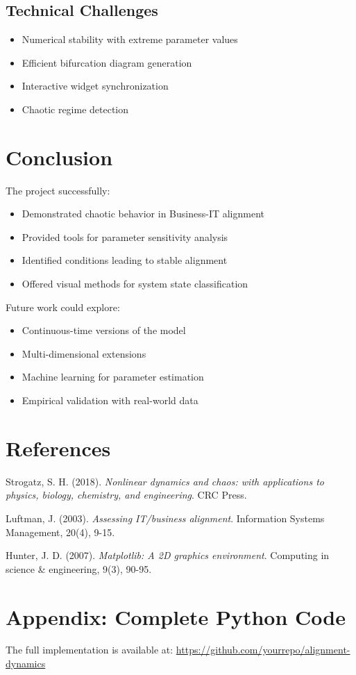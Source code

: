 \documentclass[a4paper, 12pt]{article}
\begin{document}
\subsection{Technical Challenges}
\begin{itemize}
	\item Numerical stability with extreme parameter values
	\item Efficient bifurcation diagram generation
	\item Interactive widget synchronization
	\item Chaotic regime detection
\end{itemize}

\section{Conclusion}
The project successfully:
\begin{itemize}
	\item Demonstrated chaotic behavior in Business-IT alignment
	\item Provided tools for parameter sensitivity analysis
	\item Identified conditions leading to stable alignment
	\item Offered visual methods for system state classification
\end{itemize}

Future work could explore:
\begin{itemize}
	\item Continuous-time versions of the model
	\item Multi-dimensional extensions
	\item Machine learning for parameter estimation
	\item Empirical validation with real-world data
\end{itemize}

\section*{References}
\begin{thebibliography}{9}
	Strogatz, S. H. (2018). \textit{Nonlinear dynamics and chaos: with applications to physics, biology, chemistry, and engineering}. CRC Press.

	Luftman, J. (2003). \textit{Assessing IT/business alignment}. Information Systems Management, 20(4), 9-15.

	Hunter, J. D. (2007). \textit{Matplotlib: A 2D graphics environment}. Computing in science \& engineering, 9(3), 90-95.
\end{thebibliography}

\appendix
\section{Appendix: Complete Python Code}
The full implementation is available at: \url{https://github.com/yourrepo/alignment-dynamics}
\end{document}
